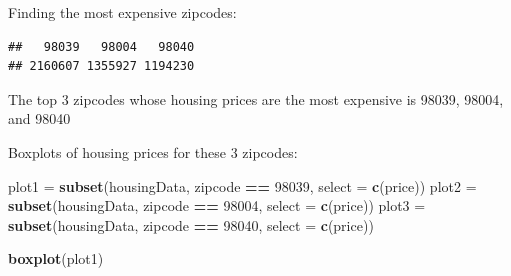 \documentclass[
]{article}
\newenvironment{Shaded}{\begin{snugshade}}{\end{snugshade}}
\newcommand{\CommentTok}[1]{\textcolor[rgb]{0.56,0.35,0.01}{\textit{#1}}}
\newcommand{\DataTypeTok}[1]{\textcolor[rgb]{0.13,0.29,0.53}{#1}}
\newcommand{\DecValTok}[1]{\textcolor[rgb]{0.00,0.00,0.81}{#1}}
\newcommand{\KeywordTok}[1]{\textcolor[rgb]{0.13,0.29,0.53}{\textbf{#1}}}
\newcommand{\NormalTok}[1]{#1}
\newcommand{\OperatorTok}[1]{\textcolor[rgb]{0.81,0.36,0.00}{\textbf{#1}}}
\newcommand{\OtherTok}[1]{\textcolor[rgb]{0.56,0.35,0.01}{#1}}
\newcommand{\StringTok}[1]{\textcolor[rgb]{0.31,0.60,0.02}{#1}}
\begin{document}
\begin{Shaded}
\end{Shaded}

Finding the most expensive zipcodes:

\begin{Shaded}
\end{Shaded}

\begin{verbatim}
##   98039   98004   98040 
## 2160607 1355927 1194230
\end{verbatim}

The top 3 zipcodes whose housing prices are the most expensive is 98039,
98004, and 98040

Boxplots of housing prices for these 3 zipcodes:

\begin{Shaded}
\begin{Highlighting}[]
\NormalTok{plot1 =}\StringTok{ }\KeywordTok{subset}\NormalTok{(housingData, zipcode }\OperatorTok{==}\StringTok{ }\DecValTok{98039}\NormalTok{, }\DataTypeTok{select =} \KeywordTok{c}\NormalTok{(price))}
\NormalTok{plot2 =}\StringTok{ }\KeywordTok{subset}\NormalTok{(housingData, zipcode }\OperatorTok{==}\StringTok{ }\DecValTok{98004}\NormalTok{, }\DataTypeTok{select =} \KeywordTok{c}\NormalTok{(price))}
\NormalTok{plot3 =}\StringTok{ }\KeywordTok{subset}\NormalTok{(housingData, zipcode }\OperatorTok{==}\StringTok{ }\DecValTok{98040}\NormalTok{, }\DataTypeTok{select =} \KeywordTok{c}\NormalTok{(price))}

\KeywordTok{boxplot}\NormalTok{(plot1)}
\end{Highlighting}
\end{Shaded}
\end{document}
